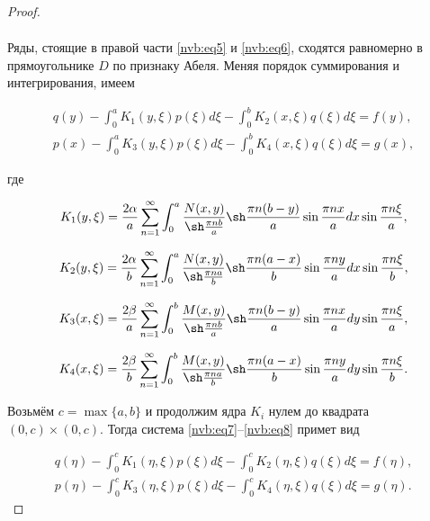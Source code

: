 \begin{proof}
\begin{multline}
\end{multline}



Ряды, стоящие в правой части \eqref{nvb:eq5} и \eqref{nvb:eq6}, сходятся равномерно в прямоугольнике $D$ по признаку Абеля. Меняя порядок суммирования и интегрирования, имеем

\begin{gather}\label{nvb:eq7}

 q(y)-\int_0^aK_1(y,\xi)p(\xi)d\xi -\int_0^b K_2(x,\xi)q(\xi)d\xi=f(y),

\\

\label{nvb:eq8}

 p(x)-\int_0^aK_3(y,\xi)p(\xi)d\xi -\int_0^b K_4(x,\xi)q(\xi)d\xi=g(x),

\end{gather}

где 

$$K_1(y,\xi)=\frac{2\alpha}{a}\sum\limits_{n=1}^\infty\int_0^a\frac{N(x,y)}{\sh\frac{\pi n b}{a}}\sh\frac{\pi n(b-y)}{a}\sin\frac{\pi n x}{a}dx\sin\frac{\pi n \xi}{a},$$

$$K_2(y,\xi)=\frac{2\alpha}{b}\sum\limits_{n=1}^\infty\int_0^a\frac{N(x,y)}{\sh\frac{\pi n a}{b}}\sh\frac{\pi n(a-x)}{b}\sin\frac{\pi n y}{a}dx\sin\frac{\pi n \xi}{b},$$

$$K_3(x,\xi)=\frac{2\beta}{a}\sum\limits_{n=1}^\infty\int_0^b\frac{M(x,y)}{\sh\frac{\pi n b}{a}}\sh\frac{\pi n(b-y)}{a}\sin\frac{\pi n x}{a}dy\sin\frac{\pi n \xi}{a},$$

$$K_4(x,\xi)=\frac{2\beta}{b}\sum\limits_{n=1}^\infty\int_0^b\frac{M(x,y)}{\sh\frac{\pi n a}{b}}\sh\frac{\pi n(a-x)}{b}\sin\frac{\pi n y}{a}dy\sin\frac{\pi n \xi}{b}.$$

 

Возьмём $c=\max\{a,b\}$ и продолжим ядра $K_i$ нулем до квадрата $(0,c)\times(0,c)$. Тогда система \eqref{nvb:eq7}--\eqref{nvb:eq8} примет вид

\begin{gather}\label{nvb:eq9}

 q(\eta)-\int_0^cK_1(\eta,\xi)p(\xi)d\xi -\int_0^c K_2(\eta,\xi)q(\xi)d\xi=f(\eta),

\\

\label{nvb:eq10}

 p(\eta)-\int_0^cK_3(\eta,\xi)p(\xi)d\xi -\int_0^c K_4(\eta,\xi)q(\xi)d\xi=g(\eta).

\end{gather}


\end{proof}

